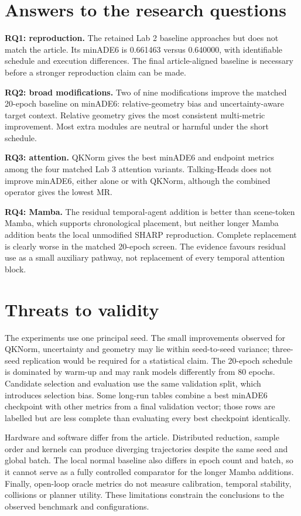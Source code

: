 \section{Answers to the research questions}

\textbf{RQ1: reproduction.} The retained Lab 2 baseline approaches but does not match the article. Its minADE6 is 0.661463 versus 0.640000, with identifiable schedule and execution differences. The final article-aligned baseline is necessary before a stronger reproduction claim can be made.

\textbf{RQ2: broad modifications.} Two of nine modifications improve the matched 20-epoch baseline on minADE6: relative-geometry bias and uncertainty-aware target context. Relative geometry gives the most consistent multi-metric improvement. Most extra modules are neutral or harmful under the short schedule.

\textbf{RQ3: attention.} QKNorm gives the best minADE6 and endpoint metrics among the four matched Lab 3 attention variants. Talking-Heads does not improve minADE6, either alone or with QKNorm, although the combined operator gives the lowest MR.

\textbf{RQ4: Mamba.} The residual temporal-agent addition is better than scene-token Mamba, which supports chronological placement, but neither longer Mamba addition beats the local unmodified SHARP reproduction. Complete replacement is clearly worse in the matched 20-epoch screen. The evidence favours residual use as a small auxiliary pathway, not replacement of every temporal attention block.

\section{Threats to validity}

The experiments use one principal seed. The small improvements observed for QKNorm, uncertainty and geometry may lie within seed-to-seed variance; three-seed replication would be required for a statistical claim. The 20-epoch schedule is dominated by warm-up and may rank models differently from 80 epochs. Candidate selection and evaluation use the same validation split, which introduces selection bias. Some long-run tables combine a best minADE6 checkpoint with other metrics from a final validation vector; those rows are labelled but are less complete than evaluating every best checkpoint identically.

Hardware and software differ from the article. Distributed reduction, sample order and kernels can produce diverging trajectories despite the same seed and global batch. The local normal baseline also differs in epoch count and batch, so it cannot serve as a fully controlled comparator for the longer Mamba additions. Finally, open-loop oracle metrics do not measure calibration, temporal stability, collisions or planner utility. These limitations constrain the conclusions to the observed benchmark and configurations.
